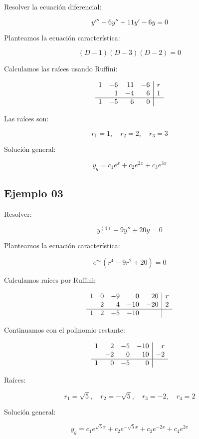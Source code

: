 Resolver la ecuación diferencial:

\[
y'''-6y''+11y'-6y=0
\]

Planteamos la ecuación característica:

\[
(D-1)(D-3)(D-2) = 0
\]

Calculamos las raíces usando Ruffini:

\[
\begin{array}{ r r r r|r }
1 & -6 & 11 & -6 & r\\
 & 1 & -4 & 6 & 1\\
\hline
1 & -5 & 6 & 0 & 
\end{array}
\]

Las raíces son:

\[
r_1 = 1, \quad r_2 = 2, \quad r_3 = 3
\]

Solución general:

\[
y_{g} = c_{1} e^{x} +c_{2} e^{2x} +c_{3} e^{3x}
\]

\subsection{Ejemplo 03}

Resolver:

\[
y^{(4)} -9y''+20y=0
\]

Planteamos la ecuación característica:

\[
e^{rx} (r^4 - 9r^2 + 20) = 0
\]

Calculamos raíces por Ruffini:

\[
\begin{array}{ r r r r r|r }
1 & 0 & -9 & 0 & 20 & r\\
 & 2 & 4 & -10 & -20 & 2\\
\hline
1 & 2 & -5 & -10 &  
\end{array}
\]

Continuamos con el polinomio restante:

\[
\begin{array}{ r r r r|r }
1 & 2 & -5 & -10 & r\\
 & -2 & 0 & 10 & -2\\
\hline
1 & 0 & -5 & 0 &  
\end{array}
\]

Raíces:

\[
r_1 = \sqrt{5}, \quad r_2 = -\sqrt{5}, \quad r_3 = -2, \quad r_4 = 2
\]

Solución general:

\[
y_{g} = c_{1} e^{\sqrt{5} x} +c_{2} e^{-\sqrt{5} x} +c_{3} e^{-2x} +c_{4} e^{2x}
\]

